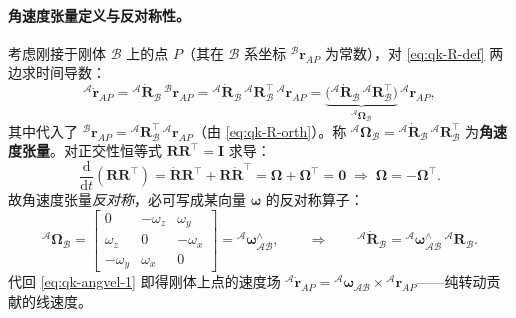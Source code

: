 \paragraph{角速度张量定义与反对称性。}
考虑刚接于刚体 $\mathcal{B}$ 上的点 $P$（其在 $\mathcal{B}$ 系坐标 ${}^{\mathcal{B}}\boldsymbol{r}_{AP}$ 为常数），对 \cref{eq:qk-R-def} 两边求时间导数\cite{yu2021quadruped}：
\begin{equation}
  {}^{\mathcal{A}}\dot{\boldsymbol{r}}_{AP}
  ={}^{\mathcal{A}}\dot{\mathbf{R}}_{\mathcal{B}}\,{}^{\mathcal{B}}\boldsymbol{r}_{AP}
  ={}^{\mathcal{A}}\dot{\mathbf{R}}_{\mathcal{B}}\,{}^{\mathcal{A}}\mathbf{R}_{\mathcal{B}}^\top\,{}^{\mathcal{A}}\boldsymbol{r}_{AP}
  =\underbrace{\big({}^{\mathcal{A}}\dot{\mathbf{R}}_{\mathcal{B}}\,{}^{\mathcal{A}}\mathbf{R}_{\mathcal{B}}^\top\big)}_{{}^{\mathcal{A}}\boldsymbol{\Omega}_{\mathcal{B}}}\,{}^{\mathcal{A}}\boldsymbol{r}_{AP},
  \label{eq:qk-angvel-1}
\end{equation}
其中代入了 ${}^{\mathcal{B}}\boldsymbol{r}_{AP}={}^{\mathcal{A}}\mathbf{R}_{\mathcal{B}}^\top\,{}^{\mathcal{A}}\boldsymbol{r}_{AP}$（由 \cref{eq:qk-R-orth}）。称 ${}^{\mathcal{A}}\boldsymbol{\Omega}_{\mathcal{B}}={}^{\mathcal{A}}\dot{\mathbf{R}}_{\mathcal{B}}\,{}^{\mathcal{A}}\mathbf{R}_{\mathcal{B}}^\top$ 为\textbf{角速度张量}。对正交性恒等式 $\mathbf{R}\mathbf{R}^\top=\mathbf{I}$ 求导：
\begin{equation}
  \frac{\mathrm{d}}{\mathrm{d}t}(\mathbf{R}\mathbf{R}^\top)
  =\dot{\mathbf{R}}\mathbf{R}^\top+\mathbf{R}\dot{\mathbf{R}}^\top
  =\boldsymbol{\Omega}+\boldsymbol{\Omega}^\top
  =\mathbf{0}
  \;\Longrightarrow\;
  \boldsymbol{\Omega}=-\boldsymbol{\Omega}^\top.
  \label{eq:qk-angvel-skew}
\end{equation}
故角速度张量\emph{反对称}，必可写成某向量 $\boldsymbol{\omega}$ 的反对称算子\cite{yu2021quadruped}：
\begin{equation}
  {}^{\mathcal{A}}\boldsymbol{\Omega}_{\mathcal{B}}
  =\begin{bmatrix}0&-\omega_z&\omega_y\\\omega_z&0&-\omega_x\\-\omega_y&\omega_x&0\end{bmatrix}
  ={}^{\mathcal{A}}\boldsymbol{\omega}_{\mathcal{AB}}^{\wedge},
  \qquad\Longrightarrow\qquad
  {}^{\mathcal{A}}\dot{\mathbf{R}}_{\mathcal{B}}={}^{\mathcal{A}}\boldsymbol{\omega}_{\mathcal{AB}}^{\wedge}\,{}^{\mathcal{A}}\mathbf{R}_{\mathcal{B}}.
  \label{eq:qk-Rdot-world}
\end{equation}
代回 \cref{eq:qk-angvel-1} 即得刚体上点的速度场 ${}^{\mathcal{A}}\dot{\boldsymbol{r}}_{AP}={}^{\mathcal{A}}\boldsymbol{\omega}_{\mathcal{AB}}\times{}^{\mathcal{A}}\boldsymbol{r}_{AP}$——纯转动贡献的线速度。

